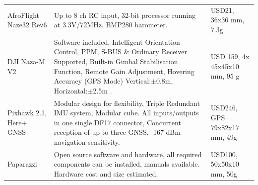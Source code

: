 \begin{table}[ht]
\begin{tabularx}{\textwidth}{>{\small}p{.12\linewidth} L  >{\small}p{.13\textwidth}  }
\\ \hdashline
AfroFlight Naze32 Rev6                   & Up to 8 ch RC input, 32-bit processor running at 3.3V/72MHz. BMP280 barometer.                                                                                                & USD21,      36x36 mm,                                                                             7.3g  %
\\ \hdashline
DJI Naza-M V2                        & Software included,  Intelligent Orientation Control, PPM, S-BUS \& Ordinary Receiver Supported, Built-in Gimbal Stabilisation Function, Remote Gain Adjustment, Hovering Accuracy (GPS Mode) Vertical:$\pm$0.8m, Horizontal:$\pm$2.5m .                                               & USD 159,   4x  45x45x10 mm, 95 g             
\\ \hdashline 
Pixhawk 2.1, Here+ GNSS                    & Modular design for flexibility, Triple Redundant IMU system, Modular cube. All inputs/outputs in one single DF17 connector, Concurrent reception of up to three GNSS, -167 dBm navigation sensitivity.                                                                                                                                        & USD246, GPS 79x82x17 mm, 49g 
\\ \hdashline
Paparazzi           & Open source software and hardware, all required components can be installed, manuals available.    Hardware cost and size estimated.         &USD100, 50x50x10 mm, 50g
\\ \bottomrule
    \end{tabularx}
\end{table}











